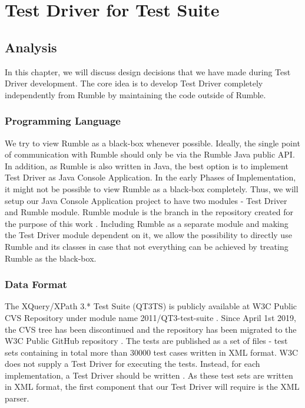 \chapter{Test Driver for Test Suite}
\section{Analysis}
In this chapter, we will discuss design decisions that we have made during Test Driver development. The core idea is to develop Test Driver completely independently from Rumble by maintaining the code outside of Rumble.

\vspace{-1mm}
\subsection{Programming Language}
We try to view Rumble as a black-box whenever possible. Ideally, the single point of communication with Rumble should only be via the Rumble Java public API. In addition, as Rumble is also written in Java, the best option is to implement Test Driver as Java Console Application. In the early Phases of Implementation, it might not be possible to view Rumble as a black-box completely. Thus, we will setup our Java Console Application project to have two modules - Test Driver and Rumble module. Rumble module is the branch in the repository created for the purpose of this work \cite{RumbleBranch}. Including Rumble as a separate module and making the Test Driver module dependent on it, we allow the possibility to directly use Rumble and its classes in case that not everything can be achieved by treating Rumble as the black-box. 

\vspace{-1mm}
\subsection{Data Format}
The XQuery/XPath 3.* Test Suite (QT3TS) is publicly available at W3C Public CVS Repository under module name 2011/QT3-test-suite \cite{TestSuiteCVSRepository}. Since April 1st 2019, the CVS tree has been discontinued and the repository has been migrated to the W3C Public GitHub repository \cite{TestSuiteGitHubRepository}. The tests are published as a set of files - test sets containing in total more than 30000 test cases written in XML format. W3C does not supply a Test Driver for executing the tests. Instead, for each implementation, a Test Driver should be written \cite{TestSuite}. As these test sets are written in XML format, the first component that our Test Driver will require is the XML parser. 

